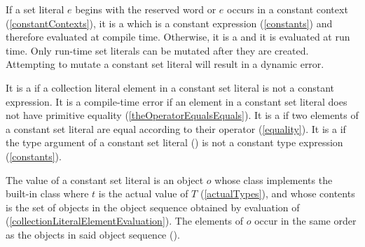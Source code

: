 \documentclass[makeidx]{article}
\begin{document}
{

\LMHash{}%
If a set literal $e$ begins with the reserved word \CONST{}
or $e$ occurs in a constant context
(\ref{constantContexts}),
it is a
which is a constant expression
(\ref{constants})
and therefore evaluated at compile time.
Otherwise, it is a
and it is evaluated at run time.
Only run-time set literals can be mutated after they are created.
Attempting to mutate a constant set literal will result in a dynamic error.


\LMHash{}%
It is a  if
a collection literal element in a constant set literal
is not a constant expression.
It is a compile-time error if
an element in a constant set literal
does not have primitive equality
(\ref{theOperatorEqualsEquals}).
It is a
 if two elements of a constant set literal are equal
according to their \lit{==} operator
(\ref{equality}).
It is a  if the type argument of a constant set literal
()
is not a constant type expression
(\ref{constants}).


\LMHash{}%
The value of a constant set literal
is an object $o$ whose class implements the built-in class
where $t$ is the actual value of $T$
(\ref{actualTypes}),
and whose contents is the set of objects in
the object sequence  obtained by
evaluation of 
(\ref{collectionLiteralElementEvaluation}).
The elements of $o$ occur in the same order as
the objects in said object sequence
().

}
\end{document}

